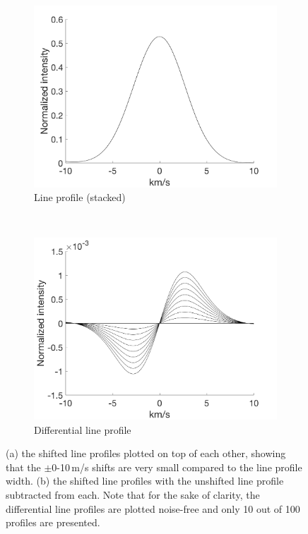\begin{figure}[tbp]
    \begin{subfigure}[b]{0.49\textwidth}
        \includegraphics[width=\textwidth]{./Figures/Methods/1-Line_Profile.png}
        \caption{Line profile (stacked)}
        \label{fig:line_profiles}
    \end{subfigure}
	~
    \begin{subfigure}[b]{0.49\textwidth}
        \includegraphics[width=\textwidth]{./Figures/Methods/1-Differential_line_Profile.png}
        \caption{Differential line profile}
        \label{fig:differential_line_profiles}
    \end{subfigure}	
    
    \caption[100 shifted HARPS-like line profiles]{(a) the shifted line profiles plotted on top of each other, showing that the $\pm$0-10\,m/s shifts are very small compared to the line profile width. (b) the shifted line profiles with the unshifted line profile subtracted from each. Note that for the sake of clarity, the differential line profiles are plotted noise-free and only 10 out of 100 profiles are presented.}
\label{fig:line_profiles12}
\end{figure}	


